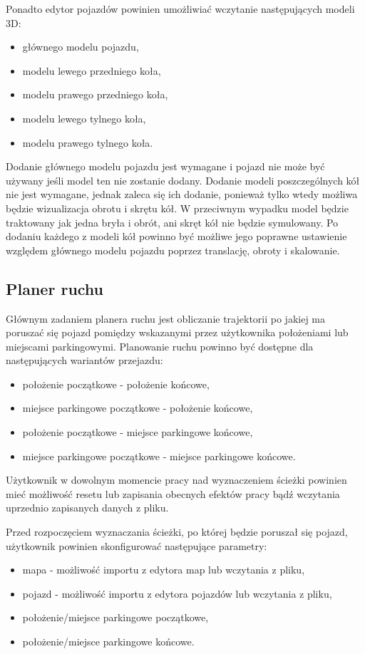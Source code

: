 \documentclass[a4paper,11pt,twoside]{report}
\theoremstyle{definition}
\begin{document}
Ponadto edytor pojazdów powinien umożliwiać wczytanie następujących modeli 3D:
\begin{itemize}
	\item głównego modelu pojazdu,
	\item modelu lewego przedniego koła,
	\item modelu prawego przedniego koła,
	\item modelu lewego tylnego koła,
	\item modelu prawego tylnego koła.
\end{itemize}

Dodanie głównego modelu pojazdu jest wymagane i pojazd nie może być używany jeśli model ten nie zostanie dodany. Dodanie modeli poszczególnych kół nie jest wymagane, jednak zaleca się ich dodanie, ponieważ tylko wtedy możliwa będzie wizualizacja obrotu i skrętu kół. W przeciwnym wypadku model będzie traktowany jak jedna bryła i obrót, ani skręt kół nie będzie symulowany. Po dodaniu każdego z modeli kół powinno być możliwe jego poprawne ustawienie względem głównego modelu pojazdu poprzez translację, obroty i skalowanie.

\subsection{Planer ruchu}

Głównym zadaniem planera ruchu jest obliczanie trajektorii po jakiej ma poruszać się pojazd pomiędzy wskazanymi przez użytkownika położeniami lub miejscami parkingowymi. Planowanie ruchu powinno być dostępne dla następujących wariantów przejazdu:
\begin{itemize}
	\item położenie początkowe - położenie końcowe,
	\item miejsce parkingowe początkowe - położenie końcowe,
	\item położenie początkowe - miejsce parkingowe końcowe,
	\item miejsce parkingowe początkowe - miejsce parkingowe końcowe.
\end{itemize}

Użytkownik w dowolnym momencie pracy nad wyznaczeniem ścieżki powinien mieć możliwość resetu lub zapisania obecnych efektów pracy bądź wczytania uprzednio zapisanych danych z pliku.

Przed rozpoczęciem wyznaczania ścieżki, po której będzie poruszał się pojazd, użytkownik powinien skonfigurować następujące parametry:
\begin{itemize}
	\item mapa - możliwość importu z edytora map lub wczytania z pliku,
	\item pojazd - możliwość importu z edytora pojazdów lub wczytania z pliku,
	\item położenie/miejsce parkingowe początkowe,
	\item położenie/miejsce parkingowe końcowe.
\end{itemize}
\end{document}

